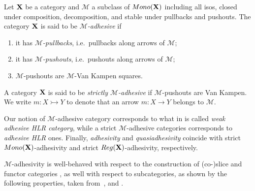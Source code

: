 \documentclass[a4paper,UKenglish,cleveref,pdftex,thm-restate,numberwithinsect]{lipics-v2021}
\def\X{\textbf {\textup{X}}}
\newcommand{\mon}{\mathsf{Mono}}
\newcommand{\reg}{\mathsf{Reg}}
\newcommand{\mto}{\rightarrowtail}
\begin{document}
\begin{definition}
	Let $\X$ be a category and $\mathcal{M}$ a subclass of
	$\mon(\X)$  including  all isos, closed under composition, decomposition,  and stable under pullbacks and pushouts.  The category  $\X$ is said to be \emph{$\mathcal{M}$-adhesive} if
	\begin{enumerate}
		\item it has \emph{$\mathcal{M}$-pullbacks}, i.e.~pullbacks along arrows of $\mathcal{M}$;
		\item it has \emph{$\mathcal{M}$-pushouts}, i.e.~pushouts along arrows of $\mathcal{M}$;
		\item  $\mathcal{M}$-pushouts are $\mathcal{M}$-Van Kampen squares.
	\end{enumerate}
	A category $\X$ is said to be \emph{strictly $\mathcal{M}$-adhesive}
	if $\mathcal{M}$-pushouts are Van Kampen. {\color{red} We write $m\colon X \mto Y$} to denote that an arrow $m\colon X\to Y$ belongs to $\mathcal{M}$.
\end{definition}



\begin{remark}
	\label{rem:salva} Our notion of $\mathcal{M}$-adhesive category corresponds to what in \cite{ehrig2006fundamentals} is called \emph{weak adhesive HLR category}, while a strict $\mathcal{M}$-adhesive categories corresponds to \emph{adhesive HLR} ones. Finally, 	\emph{adhesivity} and \emph{quasiadhesivity} 
	\cite{lack2005adhesive,garner2012axioms} coincide with strict
	$\mon(\X) $-adhesivity and strict $\reg(\X)$-adhesivity,
	respectively. %
\end{remark}


$\mathcal{M}$-adhesivity is well-behaved with respect to  the construction of (co-)slice and functor categories \cite{mac2013categories}, as well with respect to subcategories, as shown by the following properties, taken from~\cite[Thm.~4.15]{ehrig2006fundamentals}, \cite[Prop.~3.5]{lack2005adhesive} and  \cite[Thm.~2.12]{CastelnovoGM24}.
\end{document}
